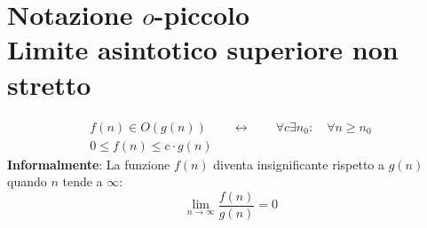 \section{Notazione $o$-piccolo\\
Limite asintotico superiore non stretto}
\begin{equation}\begin{aligned}
	f(n) \in O(g(n)) \qquad \leftrightarrow \qquad \forall c \exists n_0: \quad \forall n \geq n_0 \\
	0  \leq  f(n) \leq c \cdot g(n)
\end{aligned}\end{equation}
\textbf{Informalmente}: La funzione $f(n)$ diventa insignificante rispetto a $g(n)$ quando $n$ tende a $\infty$:
\begin{equation}
	\lim_{n \rightarrow \infty} \frac{f(n)}{g(n)} = 0
\end{equation}